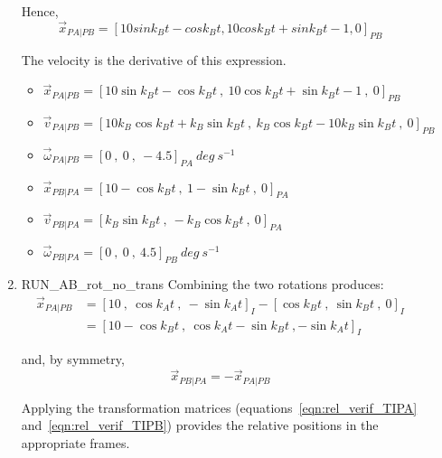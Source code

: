 \begin{description}
\begin{enumerate}
 Hence,
 \begin{equation*}
  \vec x_{PA|PB} = [10 sin k_B t - cos k_B t , 10 cos k_B t + sin k_B t - 1 , 0]_{PB}
 \end{equation*}
 
 The velocity is the derivative of this expression.
 \begin{itemize}
    \item $\vec x_{PA|PB} = [10 \sin k_B t - \cos k_B t\ ,\ 10 \cos k_B t + \sin k_B t - 1\ ,\ 0]_{PB}$
    \item $\vec v_{PA|PB} = [10 k_B \cos k_B t + k_B \sin k_B t\ ,\ k_B \cos k_B t - 10 k_B \sin k_B t\ ,\ 0]_{PB}$
    \item $\vec \omega_{PA|PB} = [0\ ,\ 0\ ,\ -4.5]_{PA}\ deg\ s^{-1}$
    \item $\vec x_{PB|PA} = [10 - \cos k_B t\ ,\ 1 - \sin k_B t\ ,\ 0]_{PA}$
    \item $\vec v_{PB|PA} = [k_B \sin k_B t\ ,\ - k_B \cos k_B t\ ,\ 0]_{PA}$
    \item $\vec \omega_{PB|PA} = [0\ ,\ 0\ ,\ 4.5]_{PB}\ deg\ s^{-1}$
   \end{itemize}
   
   
 \item RUN\_AB\_rot\_no\_trans  \newline
 Combining the two rotations produces:
 \begin{equation*}
 \begin{split}
  \vec x_{PA|PB} &= [10\                   ,\ \cos k_A t\              ,\ -\sin k_A t]_{I} - 
                  [ \cos k_B t\         ,\  \sin k_B t\            ,\ 0]_{I} \\ 
               &=[10 - \cos k_B t\       ,\ \cos k_A t - \sin k_B t\ , -\sin k_A t]_{I}
 \end{split}
 \end{equation*}
 
 and, by symmetry,
 \begin{equation*}
  \vec x_{PB|PA} = - \vec x_{PA|PB}
 \end{equation*}
 
 Applying the transformation matrices (equations~\ref{eqn:rel_verif_TIPA} and~\ref{eqn:rel_verif_TIPB}) provides the relative positions in the appropriate frames.
  

\end{enumerate}
\end{description}
